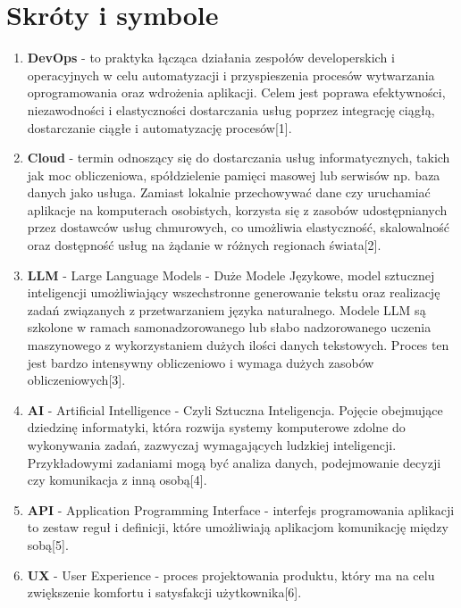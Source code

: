 \section{Skróty i symbole}

 \begin{enumerate}
    \item {\bf DevOps} - to praktyka łącząca działania zespołów developerskich i operacyjnych w celu automatyzacji i przyspieszenia procesów wytwarzania oprogramowania oraz wdrożenia aplikacji. Celem jest poprawa efektywności, niezawodności i elastyczności dostarczania usług poprzez integrację ciągłą, dostarczanie ciągłe i automatyzację procesów[1].
    
    \item {\bf Cloud} - termin odnoszący się do dostarczania usług informatycznych, takich jak moc obliczeniowa, spółdzielenie pamięci masowej lub serwisów np. baza danych jako usługa. Zamiast lokalnie przechowywać dane czy uruchamiać aplikacje na komputerach osobistych, korzysta się z zasobów udostępnianych przez dostawców usług chmurowych, co umożliwia elastyczność, skalowalność oraz dostępność usług na żądanie w różnych regionach świata[2].
    
    \item {\bf LLM} - Large Language Models - Duże Modele Językowe, model sztucznej inteligencji umożliwiający wszechstronne generowanie tekstu oraz realizację zadań związanych z przetwarzaniem języka naturalnego. Modele LLM są szkolone w ramach samonadzorowanego lub słabo nadzorowanego uczenia maszynowego z wykorzystaniem dużych ilości danych tekstowych. Proces ten jest bardzo intensywny obliczeniowo i wymaga dużych zasobów obliczeniowych[3].
    
    \item {\bf AI} - Artificial Intelligence - Czyli Sztuczna Inteligencja. Pojęcie obejmujące dziedzinę informatyki, która rozwija systemy komputerowe zdolne do wykonywania zadań, zazwyczaj wymagających ludzkiej inteligencji. Przykładowymi zadaniami mogą być analiza danych, podejmowanie decyzji czy komunikacja z inną osobą[4].
    
    \item {\bf API} - Application Programming Interface - interfejs programowania aplikacji to zestaw reguł i definicji, które umożliwiają aplikacjom komunikację między sobą[5].
    
    \item {\bf UX} - User Experience - proces projektowania produktu, który ma na celu zwiększenie komfortu i satysfakcji użytkownika[6].
    

\end{enumerate}
